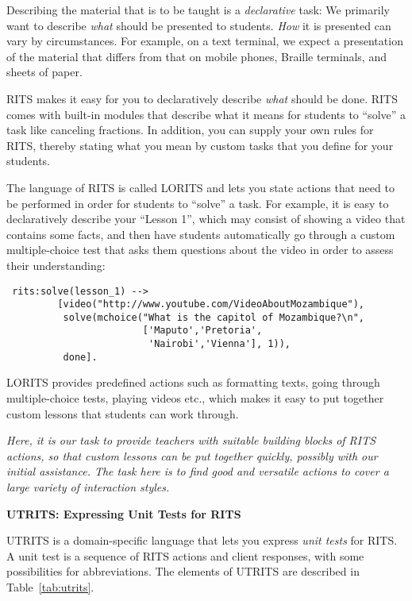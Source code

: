 \documentclass[a4paper,11pt]{article}
\begin{document}
Describing the material that is to be taught is a \textit{declarative}
task: We primarily want to describe \textit{what} should be presented
to students. \textit{How} it is presented can vary by circumstances.
For example, on a text terminal, we expect a presentation of the
material that differs from that on mobile phones, Braille terminals,
and sheets of paper.

RITS makes it easy for you to declaratively describe \textit{what}
should be done. RITS comes with built-in modules that describe what it
means for students to ``solve'' a task like canceling fractions. In
addition, you can supply your own rules for RITS, thereby stating what
you mean by custom tasks that you define for your students.

The language of RITS is called LORITS and lets you state actions that
need to be performed in order for students to ``solve'' a task. For
example, it is easy to declaratively describe your ``Lesson 1'', which
may consist of showing a video that contains some facts, and then have
students automatically go through a custom multiple-choice test that
asks them questions about the video in order to assess their
understanding:

\begin{verbatim}
 rits:solve(lesson_1) -->
         [video("http://www.youtube.com/VideoAboutMozambique"),
          solve(mchoice("What is the capitol of Mozambique?\n",
                        ['Maputo','Pretoria',
                         'Nairobi','Vienna'], 1)),
          done].
\end{verbatim}

LORITS provides predefined actions such as formatting texts, going
through multiple-choice tests, playing videos etc., which makes it
easy to put together custom lessons that students can work through.

\bigskip \textit{Here, it is our task to provide teachers with
  suitable building blocks of RITS actions, so that custom lessons can
  be put together quickly, possibly with our initial assistance. The
  task here is to find good and versatile actions to cover a large
  variety of interaction styles.}

\pagebreak

\begin{center}
  \large\textbf{UTRITS: Expressing Unit Tests for RITS}
\end{center}

\medskip
\noindent
UTRITS is a domain-specific language that lets you express
\textit{unit tests} for RITS. A unit test is a sequence of RITS
actions and client responses, with some possibilities for
abbreviations. The elements of UTRITS are described in
Table~\ref{tab:utrits}.
\end{document}
